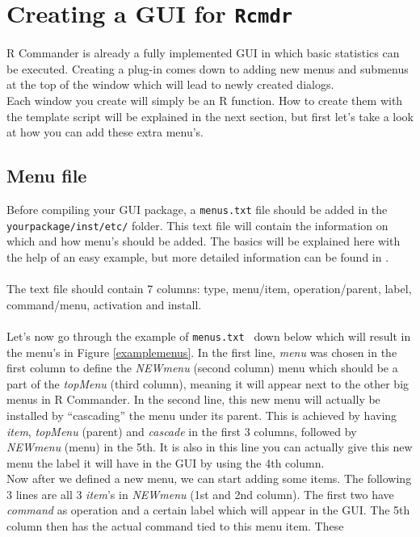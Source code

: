 \documentclass[a4paper]{article}\usepackage[]{graphicx}\usepackage[]{color}
\begin{document}
\section{Creating a GUI for \texttt{Rcmdr}}
\noindent R Commander is already a fully implemented GUI in which basic
statistics can be executed. Creating a plug-in comes down to adding new menus and submenus at the
top of the window which will lead to newly created dialogs.\\
Each window you create will simply be an R function. How to create them
with the template script will be explained in the next section, but first let's
take a look at how you can add these extra menu's.

\subsection{Menu file}
\noindent Before compiling your GUI package, a \texttt{menus.txt} file should be
added in the \texttt{yourpackage/inst/etc/} folder. This text file will contain
the information on which and how menu's should be added. The basics will be
explained here with the help of an easy example, but more detailed information
can be found in \citet{Fox2007}.
\\ \\
The text file should contain 7 columns: type, menu/item, operation/parent,
label, command/menu, activation and install.
\\ \\
Let's now go through the example of \verb|menus.txt	| down below which will
result in the menu's in Figure \ref{examplemenus}. In the first line, {\it menu}
was chosen in the first column to define the {\it NEWmenu} (second column) menu
which should be a part of the {\it topMenu} (third column), meaning it will
appear next to the other big menus in R Commander. In the second line, this new
menu will actually be installed by ``cascading'' the menu under its parent. This
is achieved by having {\it item}, {\it topMenu} (parent) and {\it cascade} in the first
3 columns, followed by {\it NEWmenu} (menu) in the 5th. It is also in this line
you can actually give this new menu the label it will have in the GUI by using
the 4th column. \\
Now after we defined a new menu, we can start adding some items. The following 3
lines are all 3 {\it item}'s in {\it NEWmenu} (1st and 2nd column). The first
two have {\it command} as operation and a certain label which will appear in the
GUI. The 5th column then has the actual command tied to this menu item. These
\end{document}
